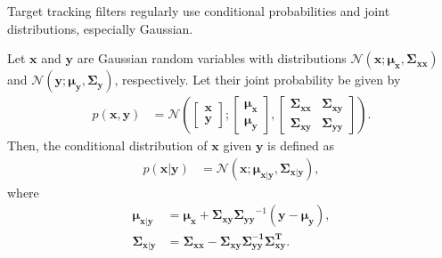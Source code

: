 Target tracking filters regularly use conditional probabilities and joint distributions, especially Gaussian. 
\begin{theorem}
Let $\mathbf{x}$ and $\mathbf{y}$ are Gaussian random variables with distributions $ \mathcal{N}(\mathbf{x};
\mathbf{\mu_x},\mathbf{\Sigma_{xx}})$ and $ \mathcal{N}(\mathbf{y};\mathbf{\mu_y},\mathbf{\Sigma_{y}})$, respectively. Let their joint probability be given by
    \begin{align}
        p(\mathbf{x}, \mathbf{y}) &= \mathcal{N}\left(
        \begin{bmatrix}
           \mathbf{x}\\
           \mathbf{y}
        \end{bmatrix};
        \begin{bmatrix}
           \mathbf{\mu_x}\\
           \mathbf{\mu_y}
        \end{bmatrix},
        \begin{bmatrix}
           \mathbf{\Sigma_{xx}} & \mathbf{\Sigma_{xy}}\\
           \mathbf{\Sigma_{xy}} & \mathbf{\Sigma_{yy}}
        \end{bmatrix}
       \right).
    \end{align}
Then, the conditional distribution of $\mathbf{x}$ given $\mathbf{y}$ is defined as
    \begin{align}
         p(\mathbf{x}|\mathbf{y}) &= \mathcal{N}(\mathbf{x};\mathbf{\mu_{x|y}},\mathbf{\Sigma_{x|y}}),
    \end{align}
where 
    \begin{align}
        \mathbf{\mu_{x|y}} &= \mathbf{\mu_{x}} + \mathbf{\Sigma_{xy}} 
        \mathbf{\Sigma_{yy}}^{-1}(\mathbf{y} - \mathbf{\mu_{y}}),\\
        \mathbf{\Sigma_{x|y}} &= \mathbf{\Sigma_{xx}} - \mathbf{\Sigma_{xy}}
        \mathbf{\Sigma_{yy}^{-1}}\mathbf{\Sigma_{xy}^T}.
    \end{align}
\end{theorem}

